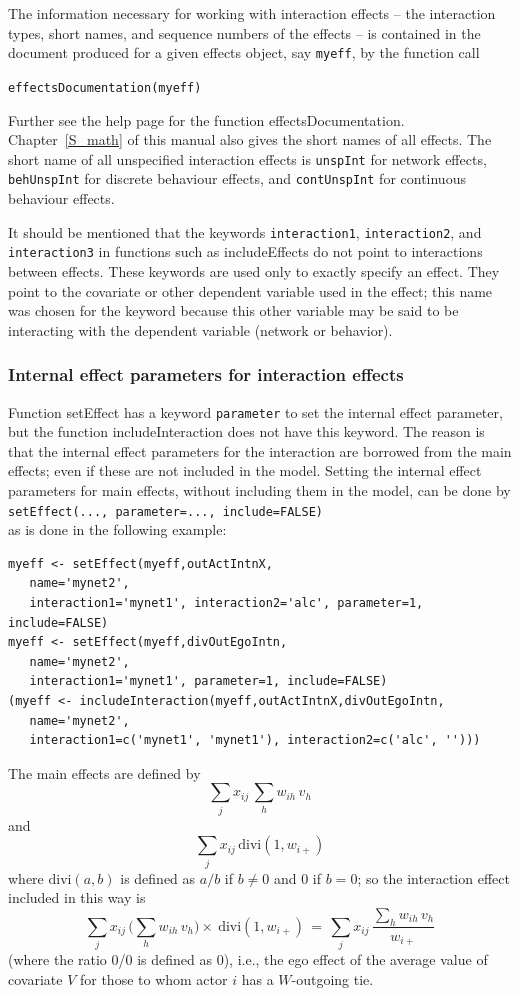 \documentclass[a4paper,fleqn,11pt]{article}
\newcommand{\+}{\, + \,}
\newcommand{\sfn}[1]{\textsf{#1}}
\begin{document}
The information necessary for working with interaction effects
-- the interaction types, short names, and sequence numbers
of the effects -- is contained in the document produced
for a given effects object, say \texttt{myeff}, by the function call

\verb|effectsDocumentation(myeff)|

\noindent
Further see the help page for the function \sfn{effectsDocumentation}.
Chapter~\ref{S_math} of this manual also gives the short names of all effects.
The short name of all unspecified interaction effects is \texttt{unspInt}
for network effects, \texttt{behUnspInt} for discrete behaviour effects,
and \texttt{contUnspInt} for continuous behaviour effects.

It should be mentioned that the keywords \texttt{interaction1},
\texttt{interaction2}, and \texttt{interaction3} in functions such as
\sfn{includeEffects} do not point to interactions between effects.
These keywords are used only to exactly specify an effect.
They point to the covariate or other dependent variable used in the effect;
this name was chosen for the keyword because this other variable may
be said to be interacting with the dependent variable (network or behavior).


\subsubsection{Internal effect parameters for interaction effects}
\label{intint}

Function \sfn{setEffect} has a keyword \texttt{parameter} to set the
internal effect parameter, but the function  \sfn{includeInteraction} does not
have this keyword. The reason is that the internal effect parameters for the
interaction are borrowed from the main effects; even if these are
not included in the model.
Setting the internal effect parameters for main effects, without including them
in the model, can be done by \\[0.2em]
\texttt{setEffect(..., parameter=..., include=FALSE)}\\[0.2em]
 as is done in the following example:
\begin{verbatim}
myeff <- setEffect(myeff,outActIntnX,
   name='mynet2',
   interaction1='mynet1', interaction2='alc', parameter=1, include=FALSE)
myeff <- setEffect(myeff,divOutEgoIntn,
   name='mynet2',
   interaction1='mynet1', parameter=1, include=FALSE)
(myeff <- includeInteraction(myeff,outActIntnX,divOutEgoIntn,
   name='mynet2',
   interaction1=c('mynet1', 'mynet1'), interaction2=c('alc', '')))
\end{verbatim}
The main effects are defined by
\[
\sum_j x_{ij}\, \sum_h w_{ih}\,v_h
\] and
\[
  \sum_j x_{ij}\, \text{divi}(1, w_{i+})
\]
where $\text{divi}(a,b)$ is defined as $a/b$ if $b \neq 0$ and 0 if $b=0$;
so the interaction effect included in this way is
\[
\sum_j x_{ij}\,  \Big( \sum_h w_{ih}\,v_h \Big) \times\ \text{divi}(1, w_{i+})
 \,=\,   \sum_j x_{ij}\, \frac{\sum_h w_{ih}\,v_h}{ w_{i+}}
\]
(where the ratio 0/0 is defined as 0), i.e., the ego effect of the
average value of covariate $V$
for those to whom actor $i$ has a $W$-outgoing tie.
\medskip
\end{document}
